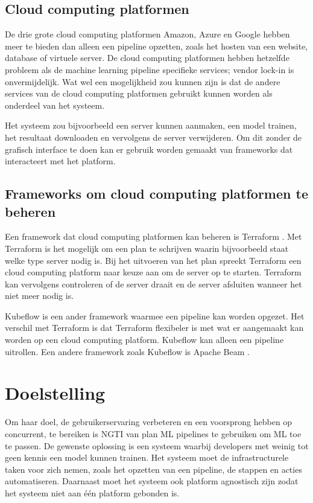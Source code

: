 \subsection{Cloud computing platformen}\label{subsec:cloud-computing-platformen}
De drie grote cloud computing platformen Amazon, Azure en Google hebben meer te bieden dan alleen een pipeline opzetten, zoals het hosten van een website, database of virtuele server. De cloud computing platformen hebben hetzelfde probleem als de machine learning pipeline specifieke services; vendor lock-in is onvermijdelijk. Wat wel een mogelijkheid zou kunnen zijn is dat de andere services van de cloud computing platformen gebruikt kunnen worden als onderdeel van het systeem.

Het systeem zou bijvoorbeeld een server kunnen aanmaken, een model trainen, het resultaat downloaden en vervolgens de server verwijderen. Om dit zonder de grafisch interface te doen kan er gebruik worden gemaakt van frameworks dat interacteert met het platform.

\subsection{Frameworks om cloud computing platformen te beheren}\label{subsec:frameworks-om-cloud-computing-platformen-te-beheren}
Een framework dat cloud computing platformen kan beheren is Terraform \cite{terraform}. Met Terraform is het mogelijk om een plan te schrijven waarin bijvoorbeeld staat welke type server nodig is. Bij het uitvoeren van het plan spreekt Terraform een cloud computing platform naar keuze aan om de server op te starten. Terraform kan vervolgens controleren of de server draait en de server afsluiten wanneer het niet meer nodig is.

Kubeflow \cite{kubeflow} is een ander framework waarmee een pipeline kan worden opgezet. Het verschil met Terraform is dat Terraform flexibeler is met wat er aangemaakt kan worden op een cloud computing platform. Kubeflow kan alleen een pipeline uitrollen. Een andere framework zoals Kubeflow is Apache Beam \cite{apache-beam}.

\section{Doelstelling}\label{sec:doelstelling}
Om haar doel, de gebruikerservaring verbeteren en een voorsprong hebben op concurrent, te bereiken is NGTI van plan ML pipelines te gebruiken om ML toe te passen. De gewenste oplossing is een systeem waarbij developers met weinig tot geen kennis een model kunnen trainen. Het systeem moet de infrastructurele taken voor zich nemen, zoals het opzetten van een pipeline, de stappen en acties automatiseren. Daarnaast moet het systeem ook platform agnostisch zijn zodat het systeem niet aan één platform gebonden is.

